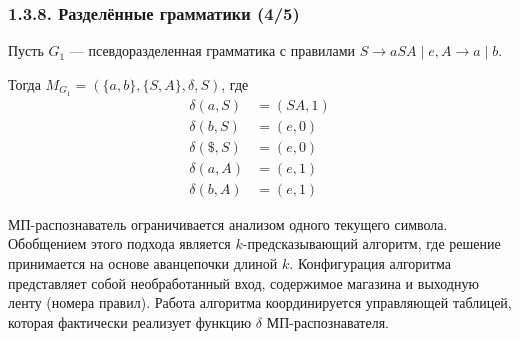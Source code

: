 \begin{frame}
\frametitle{1.3.8. Разделённые грамматики (4/5)}

\begin{example}
Пусть \( G_1 \) — псевдоразделенная грамматика с правилами
\(
S \to aSA \mid e,  A \to a \mid b.
\)

Тогда \( M_{G_1} = (\{a, b\}, \{S, A\}, \delta, S) \), где
\[
\begin{aligned}
\delta(a, S) &= (SA, 1)  \\
\delta(b, S) &= (e, 0) \\
\delta(\$, S) &= (e, 0) \\
\delta(a, A) &= (e, 1) \\
\delta(b, A) &= (e, 1)
\end{aligned}
\]
\end{example}


\begin{remark}
МП-распознаватель ограничивается анализом одного текущего символа. \\  
Обобщением этого подхода является $k$-предсказывающий алгоритм, где решение принимается на основе аванцепочки длиной $k$. Конфигурация алгоритма представляет собой необработанный вход, содержимое магазина и выходную ленту (номера правил). Работа алгоритма координируется управляющей таблицей, которая фактически реализует функцию \( \delta \) МП-распознавателя. 
\end{remark}
\end{frame}

